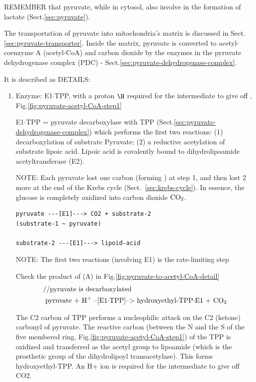 REMEMBER that pyruvate, while in cytosol, also involve in the formation of
lactate (Sect.\ref{sec:pyruvate}).

The transportation of pyruvate into mitochondria's matrix is discussed in
Sect.\ref{sec:pyruvate-transporter}. Inside the matrix, pyruvate is  converted
to acetyl-coenzyme A (acetyl-CoA) and carbon dioxide by the enzymes in
the pyruvate dehydrogenase complex (PDC) -
Sect.\ref{sec:pyruvate-dehydrogenase-complex}.



It is described as DETAILS:
\begin{enumerate}

  \item Enzyme: E1$\cdot$TPP, with a proton $\H$ required for the
  intermediate to give off , Fig.\ref{fig:pyruvate-acetyl-CoA-step1}


E1$\cdot$TPP = pyruvate decarboxylase with TPP
(Sect.\ref{sec:pyruvate-dehydrogenase-complex}) which performs the first two
reactions: (1) decarboxylation of substrate Pyruvate; (2) a reductive
acetylation of substrate lipoic acid. Lipoic acid is covalently bound to
dihydrolipoamide acetyltransferase (E2).

NOTE: Each pyruvate lost one carbon (forming ) at step 1, and then lost
2 more at the end of the Krebs cycle (Sect.~\ref{sec:krebs-cycle}). In essence,
the glucose is completely oxidized into carbon dioxide $\ce{CO2}$.

\begin{verbatim}
pyruvate ---[E1]---> CO2 + substrate-2
(substrate-1 ~ pyruvate)

substrate-2 ---[E1]---> lipoid-acid
\end{verbatim}
NOTE: The first two reactions (involving E1) is the rate-limiting step

Check the product of (A) in Fig.\ref{fig:pyruvate-to-acetyl-CoA-detail}
\begin{equation}
\begin{split}
&\text{//pyruvate is decarboxylated} \\
&\text{ pyruvate + \ce{H+} --[E1$\cdot$TPP]--> hydroxyethyl-TPP$\cdot$E1 + \ce{CO2}}
\end{split}
\end{equation}

The C2 carbon of TPP performs a nucleophilic attack on the C2 (ketone) carbonyl
of pyruvate. The reactive carbon (between the N and the S of the five membered
ring, Fig.\ref{fig:pyruvate-acetyl-CoA-step1}) of the TPP is oxidized and transferred
as the acetyl group to lipoamide (which is the prosthetic group of the
dihydrolipoyl transacetylase). This forms hydroxyethyl-TPP.
An H+ ion is required for the intermediate to give off CO2.


\end{enumerate}
